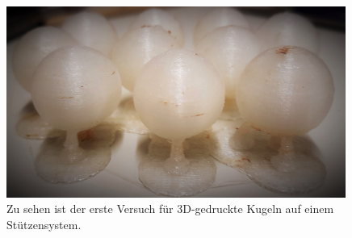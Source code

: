 \begin{figure}[htbp]
\centering
 \includegraphics[width=0.99\textwidth]{images/gedrucktekugeln2.jpg}
  \caption[3D-gedruckte Kugeln]{Zu sehen ist der erste Versuch für 3D-gedruckte Kugeln auf einem Stützensystem.}
  \label{fig:gedrucktekugeln2}
  \vspace{-0pt}
\end{figure}